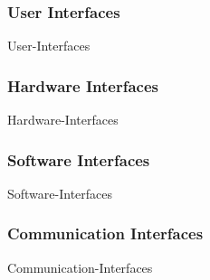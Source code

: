 \subsubsection{User	Interfaces}
{User-Interfaces}

\subsubsection{Hardware	Interfaces}
{Hardware-Interfaces}

\subsubsection{Software	Interfaces}
{Software-Interfaces}

\subsubsection{Communication Interfaces}
{Communication-Interfaces}